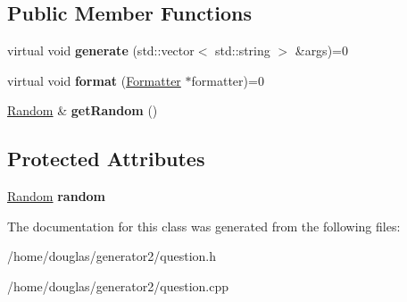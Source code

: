 \subsection*{Public Member Functions}
\begin{DoxyCompactItemize}
\item 
virtual void {\bfseries generate} (std\+::vector$<$ std\+::string $>$ \&args)=0\hypertarget{classQuestion_a8d918509068d607a936cdd1e697a210a}{}\label{classQuestion_a8d918509068d607a936cdd1e697a210a}

\item 
virtual void {\bfseries format} (\hyperlink{classFormatter}{Formatter} $\ast$formatter)=0\hypertarget{classQuestion_a6e71cfa6da8779cf2f7e294c6250647e}{}\label{classQuestion_a6e71cfa6da8779cf2f7e294c6250647e}

\item 
\hyperlink{classRandom}{Random} \& {\bfseries get\+Random} ()\hypertarget{classQuestion_a445fff50c6662c095b0bf2585c3d14fe}{}\label{classQuestion_a445fff50c6662c095b0bf2585c3d14fe}

\end{DoxyCompactItemize}
\subsection*{Protected Attributes}
\begin{DoxyCompactItemize}
\item 
\hyperlink{classRandom}{Random} {\bfseries random}\hypertarget{classQuestion_ab5cc8c4214739c66c418155c338bfeac}{}\label{classQuestion_ab5cc8c4214739c66c418155c338bfeac}

\end{DoxyCompactItemize}


The documentation for this class was generated from the following files\+:\begin{DoxyCompactItemize}
\item 
/home/douglas/generator2/question.\+h\item 
/home/douglas/generator2/question.\+cpp\end{DoxyCompactItemize}
